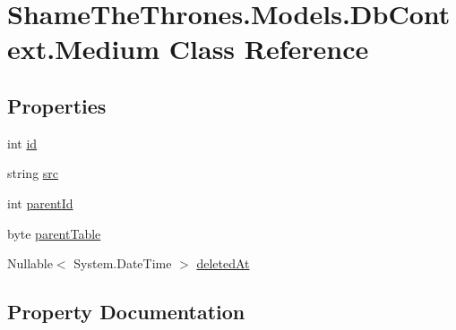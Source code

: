 \hypertarget{class_shame_the_thrones_1_1_models_1_1_db_context_1_1_medium}{}\section{Shame\+The\+Thrones.\+Models.\+Db\+Context.\+Medium Class Reference}
\label{class_shame_the_thrones_1_1_models_1_1_db_context_1_1_medium}
\subsection*{Properties}
\begin{DoxyCompactItemize}
\item 
int \hyperlink{class_shame_the_thrones_1_1_models_1_1_db_context_1_1_medium_a8f4d9fe2090a7b6dccf9d3a54d71ec56}{id}
\item 
string \hyperlink{class_shame_the_thrones_1_1_models_1_1_db_context_1_1_medium_a20efed3dc82d9ca239f7fdfcb98995fe}{src}
\item 
int \hyperlink{class_shame_the_thrones_1_1_models_1_1_db_context_1_1_medium_acb10591b0b333c80f7eeb7ca75baaeed}{parent\+Id}
\item 
byte \hyperlink{class_shame_the_thrones_1_1_models_1_1_db_context_1_1_medium_ab4933d3b0b877c99da6bff35d38a5b4c}{parent\+Table}
\item 
Nullable$<$ System.\+Date\+Time $>$ \hyperlink{class_shame_the_thrones_1_1_models_1_1_db_context_1_1_medium_a3582f72af62a4b8244698d851ce90efb}{deleted\+At}
\end{DoxyCompactItemize}


\subsection{Property Documentation}
